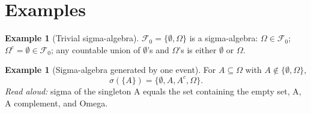\documentclass[11pt]{article}
\theoremstyle{definition}
\newtheorem{example}[theorem]{Example}
\begin{document}
\section{Examples}

\begin{example}[Trivial sigma-algebra]
$\mathcal{F}_{0} = \{\emptyset, \Omega\}$ is a sigma-algebra: $\Omega \in \mathcal{F}_{0}$; $\Omega^{c} = \emptyset \in \mathcal{F}_{0}$; any countable union of $\emptyset$'s and $\Omega$'s is either $\emptyset$ or $\Omega$.
\end{example}

\begin{example}[Sigma-algebra generated by one event]
For $A \subseteq \Omega$ with $A \notin \{\emptyset, \Omega\}$,
\[
\sigma(\{A\}) = \{\emptyset, A, A^{c}, \Omega\}.
\]
\emph{Read aloud:} sigma of the singleton A equals the set containing the empty set, A, A complement, and Omega.
\end{example}
\end{document}
